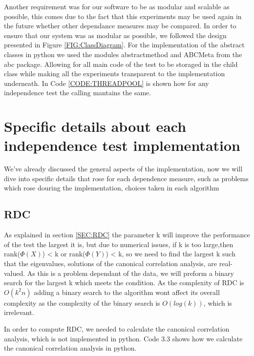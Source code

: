 Another requirement was for our software to be as modular and scalable as possible, this comes due to the fact that this experiments may be used again in the future whether other dependance measures may be compared.
In order to ensure that our system was as modular as possible, we followed the design presented in Figure \ref{FIG:ClassDiagram}.
For the implementation of the abstract classes in python we used the modules abstractmethod and ABCMeta from the abc package. Allowing for all main code of the test to be storaged in the child class while making all the experiments transparent to the implementation underneath. In Code  \ref{CODE:THREADPOOL} is shown how for any independence test the calling mantains the same.

\section{Specific details about each independence test implementation}

We've already discussed the general aspects of the implementation, now we will dive into specific details that rose for each dependence measure, such as problems which rose douring the implementation, choices taken in each algorithm 


\subsection{RDC}

As explained in section \ref{SEC:RDC} the parameter k will improve the performance of the test the largest it is, but due to numerical issues, if k is too large,then rank($\Phi(X)$) < k or rank($\Phi(Y)$) < k, so we need to find the largest k such that the eigenvalues, solutions of the canonical correlation analysis,  are real-valued. As this is a problem dependant of the data, we will preform a binary search for the largest k which meets the condition. As the complexity of RDC is $O(k^{2}n)$ adding a binary search to the algorithm wont affect its overall complexity as the complexity of the binary search is $O(log(k))$, which is irrelevant.

In order to compute RDC, we needed to calculate the canonical correlation analysis, which is not implemented in python. Code 3.3 shows how we calculate the canonical correlation analysis in python.

\label{CODE:CANCOR}


